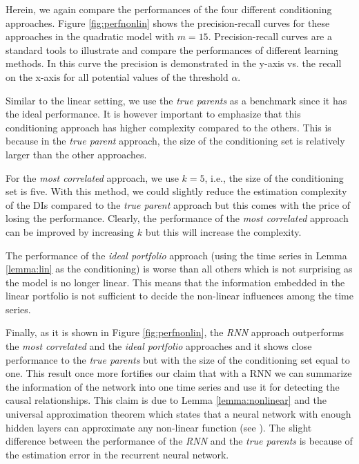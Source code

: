Herein, we again compare the performances of the four different conditioning approaches. 
Figure \ref{fig:perfnonlin} shows the precision-recall curves for these approaches in the quadratic model with $m=15$. 
Precision-recall curves are a standard tools to illustrate and compare the performances of different learning methods. 
In this curve the precision is demonstrated in the y-axis vs. the recall on the x-axis for all potential values of the threshold $\alpha$. 

Similar to the linear setting, we use the \textit{true parents} as a benchmark since it has the ideal performance. 
It is however important to emphasize that this conditioning approach has higher complexity compared to the others. 
This is because in the \textit{true parent} approach, the size of the conditioning set is relatively larger than the other approaches. 

For the \textit{most correlated} approach, we use $k=5$, i.e., the size of the conditioning set is five.
With this method, we could slightly reduce the estimation complexity of the DIs compared to the  \textit{true parent} approach but this comes with the price of losing the performance.
Clearly, the performance of the \textit{most correlated} approach can be improved by increasing $k$ but this will increase the complexity.

The performance of the \textit{ideal portfolio} approach (using the time series in Lemma \ref{lemma:lin} as the conditioning) is worse than all others which is not surprising as the model is no longer linear. 
This means that the information embedded in the linear portfolio is not sufficient to decide the non-linear influences among the time series. 

Finally, as it is shown in Figure \ref{fig:perfnonlin}, the \textit{RNN} approach outperforms the \textit{most correlated} and the \textit{ideal portfolio} approaches and it shows close performance to the \textit{true parents} but with the size of the conditioning set equal to one. 
This result once more fortifies our claim that with a RNN we can summarize the information of the network into one time series and use it for detecting the causal relationships. 
This claim is due to Lemma \ref{lemma:nonlinear} and the universal approximation theorem which states that a neural network with enough hidden layers can approximate any non-linear function (see \citet{HORNIK1989359}).
The slight difference between the performance of the \textit{RNN} and the \textit{true parents} is because of the estimation error in the recurrent neural network. 

